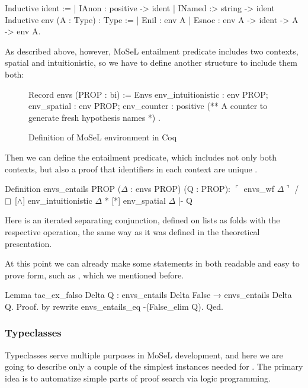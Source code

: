 \begin{coq}
Inductive ident :=
  | IAnon : positive -> ident
  | INamed :> string -> ident
Inductive env (A : Type) : Type :=
  | Enil : env A
  | Esnoc : env A -> ident -> A -> env A.
\end{coq}

As described above, however, MoSeL entailment predicate includes two contexts, spatial and intuitionistic, so we have to define another structure to include them both:

\begin{figure}[H]
\centering
\begin{coq}
Record envs (PROP : bi) := Envs {
  env_intuitionistic : env PROP;
  env_spatial : env PROP;
  env_counter : positive (** A counter to generate fresh hypothesis names *)
}.
\end{coq}
\caption{Definition of MoSeL environment in Coq}
\label{fig:coq_envs}
\end{figure}


Then we can define the entailment predicate, which includes not only both contexts, but also a proof that identifiers in each context are unique .
\begin{coq}
  Definition envs_entails {PROP} ($\Delta$ : envs PROP) (Q : PROP):
  $\ulcorner$ envs_wf $\Delta \urcorner$ /\ $\mathop{\Box}$ [$\wedge$] env_intuitionistic $\Delta$ * [*] env_spatial $\Delta$ |- Q
\end{coq}

Here \coqe{[*]} is an iterated separating conjunction, defined on lists as folds with the respective operation, the same way as it was defined in the theoretical presentation.

At this point we can already make some statements in both readable and easy to prove form, such as , which we mentioned before.

\begin{coq}
Lemma tac_ex_falso Delta Q : envs_entails Delta False → envs_entails Delta Q.
Proof. by rewrite envs_entails_eq -(False_elim Q). Qed.
\end{coq}

\subsubsection{Typeclasses}
\label{subsubsec:typeclasses}

Typeclasses serve multiple purposes in MoSeL development, and here we are going to describe only a couple of the simplest instances needed for .
The primary idea is to automatize simple parts of proof search via logic programming.

